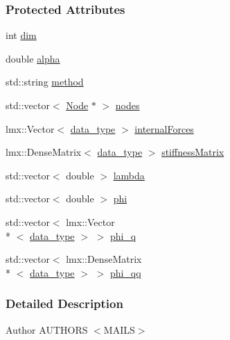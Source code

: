 \subsubsection*{Protected Attributes}
\begin{DoxyCompactItemize}
\item 
int \hyperlink{classmknix_1_1_constraint_a5fa3727603b390206e6431141b892517}{dim}
\item 
double \hyperlink{classmknix_1_1_constraint_ab76845f20e7a29693b9161e09074d55a}{alpha}
\item 
std\-::string \hyperlink{classmknix_1_1_constraint_ab05c0dcc5cc535f4e3bed2fd34ed6d75}{method}
\item 
std\-::vector$<$ \hyperlink{classmknix_1_1_node}{Node} $\ast$ $>$ \hyperlink{classmknix_1_1_constraint_aa4aa16e121963acf4c086f63137d4ac1}{nodes}
\item 
lmx\-::\-Vector$<$ \hyperlink{namespacemknix_a16be4b246fbf2cceb141e3a179111020}{data\-\_\-type} $>$ \hyperlink{classmknix_1_1_constraint_a0b0fbbf149c32ce0a9dd6e0c4dd5851e}{internal\-Forces}
\item 
lmx\-::\-Dense\-Matrix$<$ \hyperlink{namespacemknix_a16be4b246fbf2cceb141e3a179111020}{data\-\_\-type} $>$ \hyperlink{classmknix_1_1_constraint_ab4b508cdbea36124b925f52525a1d5ad}{stiffness\-Matrix}
\item 
std\-::vector$<$ double $>$ \hyperlink{classmknix_1_1_constraint_aeee7c3bdd61194e3df0e958ff237040a}{lambda}
\item 
std\-::vector$<$ double $>$ \hyperlink{classmknix_1_1_constraint_a10e027fc12cb248a49a1ded049f0a161}{phi}
\item 
std\-::vector$<$ lmx\-::\-Vector\\*
$<$ \hyperlink{namespacemknix_a16be4b246fbf2cceb141e3a179111020}{data\-\_\-type} $>$ $>$ \hyperlink{classmknix_1_1_constraint_a667ecb78177b06981c30e23cb194b806}{phi\-\_\-q}
\item 
std\-::vector$<$ lmx\-::\-Dense\-Matrix\\*
$<$ \hyperlink{namespacemknix_a16be4b246fbf2cceb141e3a179111020}{data\-\_\-type} $>$ $>$ \hyperlink{classmknix_1_1_constraint_a9173b52da189652951ce51b1d69fcde4}{phi\-\_\-qq}
\end{DoxyCompactItemize}


\subsubsection{Detailed Description}
\begin{DoxyAuthor}{Author}
A\-U\-T\-H\-O\-R\-S $<$\-M\-A\-I\-L\-S$>$ 
\end{DoxyAuthor}


